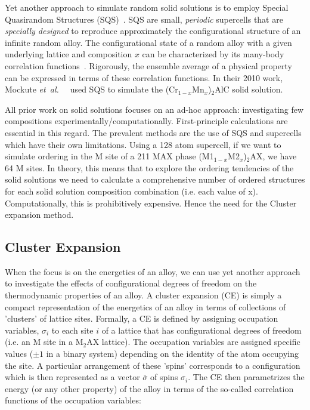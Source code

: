 \documentclass[preprint,amsmath,amssymb,aps, prb,showkeys]{revtex4-1}
\def\etal{\mbox{\it et al.\ }}
\begin{document}
Yet another approach to simulate random solid solutions is to employ Special Quasirandom Structures (SQS)~\cite{zunger1990special}. SQS are small, \emph{periodic} supercells that are \emph{specially designed} to reproduce approximately the configurational structure of an infinite random alloy. The configurational state of a random alloy with a given underlying lattice and composition $x$ can be characterized by its many-body correlation functions~\cite{zunger1990special}. Rigorously, the ensemble average of a physical property can be 
expressed in terms of these correlation functions. In their 2010 work, Mockute \etal~\cite{mockute2015solid} used SQS to simulate the (Cr$_{1-x}$Mn$_x$)$_2$AlC solid solution.

All prior work on solid solutions focuses on an ad-hoc approach: investigating few compositions experimentally/computationally. First-principle calculations are essential in this regard. The prevalent methods are the use of SQS and supercells which have their own limitations. Using a 128 atom supercell, if we want to simulate ordering in the M site of a 211 MAX phase (M1$_{1-x}$M2$_x$)$_2$AX, we have 64 M sites. In theory, this means that to explore the ordering tendencies of the solid solutions we need to calculate a comprehensive number of ordered structures for each solid solution composition combination (i.e. each value of x). Computationally, this is prohibitively expensive. Hence the need for the Cluster expansion method.

\subsection{Cluster Expansion}
When the focus is on the energetics of an alloy, we can use yet another approach to investigate the effects of configurational degrees of freedom on the thermodynamic properties of an alloy. A cluster expansion (CE) is simply a compact representation of the energetics of an alloy in terms of collections of 'clusters' of lattice sites. Formally, a CE is defined by assigning occupation variables, $\sigma_i$ to each site $i$ of a lattice that has configurational degrees of freedom (i.e. an M site in a M$_2$AX lattice). The occupation variables are assigned specific values ($\pm1$ in a binary system) depending on the identity of the atom occupying the site. A particular arrangement of these 'spins' corresponds to a configuration which is then represented as a vector $\overline{\sigma}$ of spins $\sigma_i$. The CE then parametrizes the energy (or any other property) of the alloy in terms of the so-called correlation functions of the occupation variables:
\end{document}
